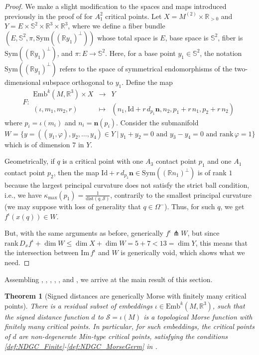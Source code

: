 \documentclass[11pt]{article}
\newcommand{\R}{\mathbb{R}}
\newcommand{\io}{\iota}
\newcommand{\nbf}{\mathbf{n}}
\newcommand{\W}{\Omega}
\newcommand{\kap}{\kappa}
\newcommand{\Emb}{\mathrm{Emb}^k(M,\R^3)}
\newcommand{\dist}{\mathrm{dist}}
\newcommand{\Surf}{\mathcal{S}}
\newcommand{\Id}{\mathrm{Id}}
\renewcommand{\Im}{\mathrm{Im} \,}
\newcommand{\rank}{\mathrm{rank} \,}
\theoremstyle{plain}
\newtheorem{thm}{Theorem}
\theoremstyle{definition}
\theoremstyle{remark}
\begin{document}
	\begin{proof}
		We make a slight modification to the spaces and maps introduced previously in the proof of  for $A_1^2$ critical points. Let $X = M^{(2)} \times \R_{>0}$ and $Y = E \times \mathbb{S}^2 \times \R^3 \times \R^3$, where we define a fiber bundle $(E, \mathbb{S}^2, \pi, \mathrm{Sym}((\R y_1)^\perp))$ whose total space is $E$, base space is $\mathbb{S}^2$, fiber is $\mathrm{Sym}((\R y_1)^\perp)$, and $\pi : E \to \mathbb{S}^2$. Here, for a base point $y_1 \in \mathbb{S}^2$, the notation $\mathrm{Sym}((\R y_1)^\perp)$ refers to the space of symmetrical endomorphisms of the two-dimensional subspace orthogonal to $y_1$. 
		Define the map
		\begin{equation}
			F:
			\begin{array}{ccc}
				\Emb \times X & \to & Y \\
				(\io, m_1,m_2,r) & \mapsto & (n_1, \Id + r \, d_{p_1}\nbf, n_2, p_1 + r \, n_1, p_2 + r \, n_2 )
			\end{array}
		\end{equation}
		where $p_i = \io(m_i)$ and $n_i = \nbf(p_i)$. Consider the submanifold $W = \{y = ( (y_1, \varphi), y_2, \ldots, y_4)\in Y ~|~ y_1 + y_2 = 0 \text{ and } y_3 - y_4 = 0 \text{ and } \rank \varphi = 1\}$ which is of dimension $7$ in $Y$.
		
		Geometrically, if $q$ is a critical point with one $A_3$ contact point $p_1$ and one $A_1$ contact point $p_2$, then the map $\Id + r \, d_{p_1}\nbf \in \mathrm{Sym}((\R n_1)^\perp)$ is of rank $1$ because the largest principal curvature does not satisfy the strict ball condition, i.e., we have $\kap_{\text{max}}(p_1) = \frac{1}{\dist(q,\Surf)}$, contrarily to the smallest principal curvature (we may suppose with loss of generality that $q \in \W^-$). Thus, for such $q$, we get $f^\io(x(q)) \in W$.
		
		But, with the same arguments as before, generically $f^\io \pitchfork W$, but since $\rank D_x f^\io + \dim W \leq \dim X + \dim W = 5 + 7 < 13 = \dim Y$, this means that the intersection between $\Im f^\io$ and $W$ is generically void, which shows what we need.
	\end{proof}
	
	Assembling , , , , , and , we arrive at the main result of this section. 
	
	\begin{thm}[Signed distances are generically Morse with finitely many critical points]
		\label{thm:generic}
		There is a residual subset of embeddings $\io \in \Emb$, such that the signed distance function $d$ to $\Surf = \io(M)$ is a topological Morse function with finitely many critical points. In particular, for such embeddings, the critical points of $d$ are non-degenerate Min-type critical points, satisfying the conditions \ref{def:NDGC_Finite}-\ref{def:NDGC_MorseGerm} in .
	\end{thm}
	
\end{document}
